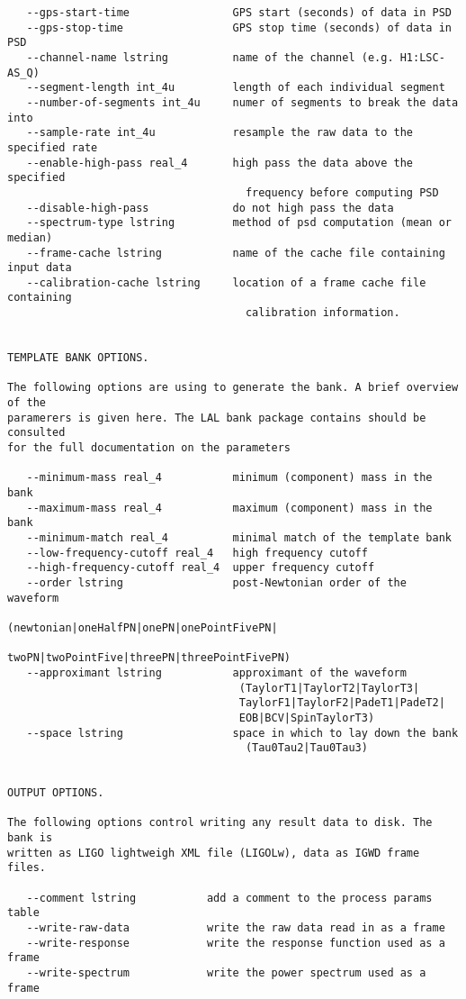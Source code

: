 \begin{verbatim}
   --gps-start-time                GPS start (seconds) of data in PSD
   --gps-stop-time                 GPS stop time (seconds) of data in PSD
   --channel-name lstring          name of the channel (e.g. H1:LSC-AS_Q)
   --segment-length int_4u         length of each individual segment
   --number-of-segments int_4u     numer of segments to break the data into
   --sample-rate int_4u            resample the raw data to the specified rate
   --enable-high-pass real_4       high pass the data above the specified
                                     frequency before computing PSD
   --disable-high-pass             do not high pass the data
   --spectrum-type lstring         method of psd computation (mean or median)
   --frame-cache lstring           name of the cache file containing input data
   --calibration-cache lstring     location of a frame cache file containing
                                     calibration information.


TEMPLATE BANK OPTIONS.

The following options are using to generate the bank. A brief overview of the
paramerers is given here. The LAL bank package contains should be consulted
for the full documentation on the parameters

   --minimum-mass real_4           minimum (component) mass in the bank
   --maximum-mass real_4           maximum (component) mass in the bank
   --minimum-match real_4          minimal match of the template bank
   --low-frequency-cutoff real_4   high frequency cutoff
   --high-frequency-cutoff real_4  upper frequency cutoff
   --order lstring                 post-Newtonian order of the waveform
                                    (newtonian|oneHalfPN|onePN|onePointFivePN|
                                    twoPN|twoPointFive|threePN|threePointFivePN)
   --approximant lstring           approximant of the waveform
                                    (TaylorT1|TaylorT2|TaylorT3|
                                    TaylorF1|TaylorF2|PadeT1|PadeT2|
                                    EOB|BCV|SpinTaylorT3)
   --space lstring                 space in which to lay down the bank
                                     (Tau0Tau2|Tau0Tau3)


OUTPUT OPTIONS.

The following options control writing any result data to disk. The bank is
written as LIGO lightweigh XML file (LIGOLw), data as IGWD frame files.

   --comment lstring           add a comment to the process params table
   --write-raw-data            write the raw data read in as a frame
   --write-response            write the response function used as a frame
   --write-spectrum            write the power spectrum used as a frame



\end{verbatim}
